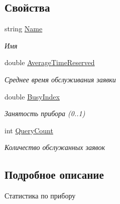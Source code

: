 \subsection*{Свойства}
\begin{DoxyCompactItemize}
\item 
string \hyperlink{class_s_m_p_l_sharp_1_1_utils_1_1_smpl_r_device_statisic_a7a9601632b7585ab8df008cd59698f0d}{Name}
\begin{DoxyCompactList}\small\item\em Имя \end{DoxyCompactList}\item 
double \hyperlink{class_s_m_p_l_sharp_1_1_utils_1_1_smpl_r_device_statisic_aefc83dcc8f91247e91d1966ada1d7885}{Average\-Time\-Reserved}
\begin{DoxyCompactList}\small\item\em Среднее время обслуживания заявки \end{DoxyCompactList}\item 
double \hyperlink{class_s_m_p_l_sharp_1_1_utils_1_1_smpl_r_device_statisic_a437aa023cf628ea90f8a0f7091fb7e27}{Busy\-Index}
\begin{DoxyCompactList}\small\item\em Занятость прибора (0..1) \end{DoxyCompactList}\item 
int \hyperlink{class_s_m_p_l_sharp_1_1_utils_1_1_smpl_r_device_statisic_ac8c73d6bf105ba2983b1160b4b037cef}{Query\-Count}
\begin{DoxyCompactList}\small\item\em Количество обслужанных заявок \end{DoxyCompactList}\end{DoxyCompactItemize}


\subsection{Подробное описание}
Статистика по прибору 



